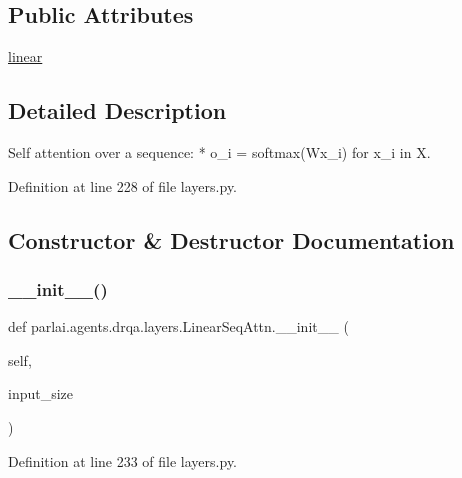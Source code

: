 \subsection*{Public Attributes}
\begin{DoxyCompactItemize}
\item 
\hyperlink{classparlai_1_1agents_1_1drqa_1_1layers_1_1LinearSeqAttn_a5e221c809306db7c5877e5f6f919ac7f}{linear}
\end{DoxyCompactItemize}


\subsection{Detailed Description}
\begin{DoxyVerb}Self attention over a sequence:
* o_i = softmax(Wx_i) for x_i in X.
\end{DoxyVerb}
 

Definition at line 228 of file layers.\+py.



\subsection{Constructor \& Destructor Documentation}
\mbox{\label{classparlai_1_1agents_1_1drqa_1_1layers_1_1LinearSeqAttn_a4f7535d9314733bcbcbe957d96600907}} 
\subsubsection{\texorpdfstring{\+\_\+\+\_\+init\+\_\+\+\_\+()}{\_\_init\_\_()}}
{\footnotesize\ttfamily def parlai.\+agents.\+drqa.\+layers.\+Linear\+Seq\+Attn.\+\_\+\+\_\+init\+\_\+\+\_\+ (\begin{DoxyParamCaption}\item[{}]{self,  }\item[{}]{input\+\_\+size }\end{DoxyParamCaption})}



Definition at line 233 of file layers.\+py.



